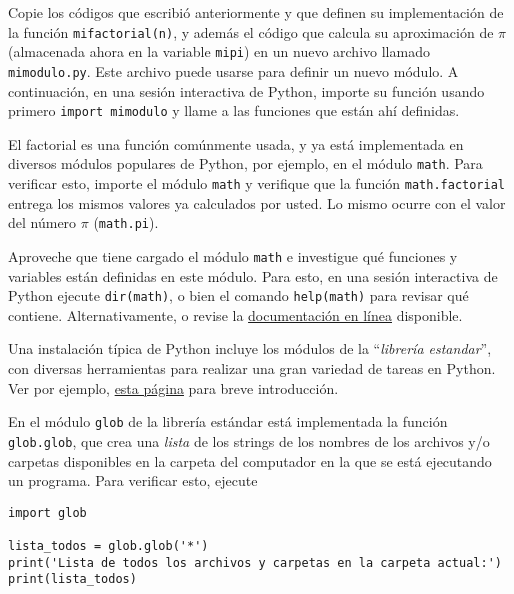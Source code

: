 \documentclass[11pt]{exam}
\begin{document}
\begin{questions}
\item Copie los códigos que escribió anteriormente y que definen su implementación de  la función \texttt{mifactorial(n)}, y además el código que calcula su aproximación de $\pi$ (almacenada ahora en la variable \texttt{mipi}) en un nuevo archivo llamado \texttt{mimodulo.py}. Este archivo puede usarse para definir un nuevo módulo. A continuación, en una sesión interactiva de Python, importe su función usando primero \texttt{import mimodulo} y llame a las funciones que están ahí definidas. 

\item El factorial es una función comúnmente usada, y ya está implementada en diversos módulos populares de Python, por ejemplo, en el módulo \texttt{math}. Para verificar esto, importe el módulo \texttt{math} y verifique que la función \texttt{math.factorial} entrega los mismos valores ya calculados por usted. Lo mismo ocurre con el valor del número $\pi$ (\texttt{math.pi}). 

\item Aproveche que tiene cargado el módulo \texttt{math} e investigue qué funciones y variables están definidas en este módulo. Para esto, en una sesión interactiva de Python ejecute \texttt{dir(math)}, o bien el comando \texttt{help(math)} para revisar qué contiene. Alternativamente, o revise la \href{https://docs.python.org/3/library/math.html}{documentaci\'on en l\'inea} disponible.

\item Una instalación típica de Python incluye los módulos de la ``\textit{librería estandar}'', con diversas herramientas para realizar una gran variedad de tareas en Python. Ver por ejemplo, \href{https://docs.python.org/es/3/library/index.html}{esta página} para breve introducción.

\item En el módulo \texttt{glob} de la librería estándar está implementada la función \texttt{glob.glob}, que crea una \textit{lista} de los strings de los nombres de los archivos y/o carpetas disponibles en la carpeta del computador en la que se está ejecutando un programa. Para verificar esto, ejecute

\begin{verbatim}
import glob

lista_todos = glob.glob('*')
print('Lista de todos los archivos y carpetas en la carpeta actual:')
print(lista_todos)


\end{verbatim}
\end{questions}
\end{document}
